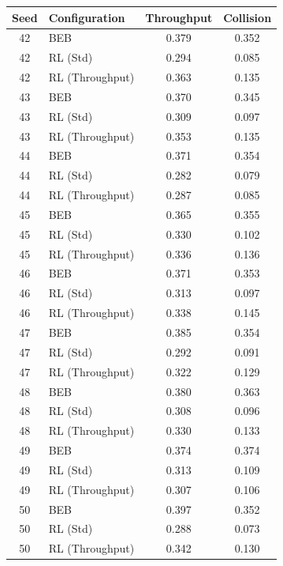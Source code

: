 \documentclass[12pt,a4paper,oneside]{article}
\theoremstyle{definition}
\begin{document}
\begin{table}[H]
    \centering
    \small
    \begin{tabular}{|c|l|c|c|}
        \hline
        \textbf{Seed} & \textbf{Configuration} & \textbf{Throughput} & \textbf{Collision} \\
        \hline
        42 & BEB & 0.379 & 0.352 \\
        42 & RL (Std) & 0.294 & 0.085 \\
        42 & RL (Throughput) & 0.363 & 0.135 \\
        \hline
        43 & BEB & 0.370 & 0.345 \\
        43 & RL (Std) & 0.309 & 0.097 \\
        43 & RL (Throughput) & 0.353 & 0.135 \\
        \hline
        44 & BEB & 0.371 & 0.354 \\
        44 & RL (Std) & 0.282 & 0.079 \\
        44 & RL (Throughput) & 0.287 & 0.085 \\
        \hline
        45 & BEB & 0.365 & 0.355 \\
        45 & RL (Std) & 0.330 & 0.102 \\
        45 & RL (Throughput) & 0.336 & 0.136 \\
        \hline
        46 & BEB & 0.371 & 0.353 \\
        46 & RL (Std) & 0.313 & 0.097 \\
        46 & RL (Throughput) & 0.338 & 0.145 \\
        \hline
        47 & BEB & 0.385 & 0.354 \\
        47 & RL (Std) & 0.292 & 0.091 \\
        47 & RL (Throughput) & 0.322 & 0.129 \\
        \hline
        48 & BEB & 0.380 & 0.363 \\
        48 & RL (Std) & 0.308 & 0.096 \\
        48 & RL (Throughput) & 0.330 & 0.133 \\
        \hline
        49 & BEB & 0.374 & 0.374 \\
        49 & RL (Std) & 0.313 & 0.109 \\
        49 & RL (Throughput) & 0.307 & 0.106 \\
        \hline
        50 & BEB & 0.397 & 0.352 \\
        50 & RL (Std) & 0.288 & 0.073 \\
        50 & RL (Throughput) & 0.342 & 0.130 \\

\end{tabular}
\end{table}
\end{document}
